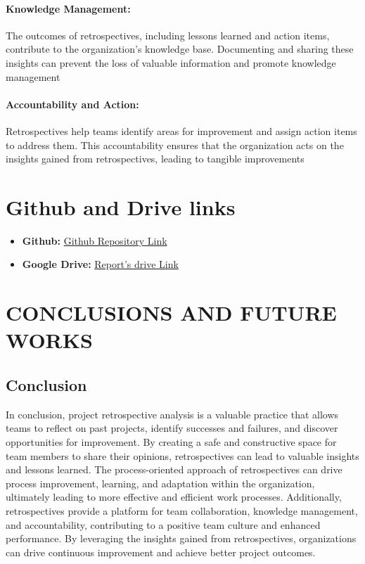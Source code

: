 \documentclass{article}
\begin{document}
\paragraph*{Knowledge Management:}The outcomes of retrospectives, including lessons learned and action items, contribute to the organization's knowledge base. Documenting and sharing these insights can prevent the loss of valuable information and promote knowledge management
\paragraph*{Accountability and Action:}Retrospectives help teams identify areas for improvement and assign action items to address them. This accountability ensures that the organization acts on the insights gained from retrospectives, leading to tangible improvements

\section{Github and Drive links}
\begin{itemize}
    \item \textbf{Github: }\href{https://github.com/saurabhs679/SOEN6841_TOPIC_ANALYSIS_AND_SYNTHESIS}{Github Repository Link}
    \item \textbf{Google Drive: }\href{https://drive.google.com/drive/folders/1ep7LRbaq3LcP8R7s5j6O8cZ1Xn__iD4b?usp=sharing}{Report's drive Link}
\end{itemize}


\newpage
\section{CONCLUSIONS AND FUTURE WORKS}
\subsection{Conclusion}
In conclusion, project retrospective analysis is a valuable practice that allows teams to reflect on past projects, identify successes and failures, and discover opportunities for improvement. By creating a safe and constructive space for team members to share their opinions, retrospectives can lead to valuable insights and lessons learned. The process-oriented approach of retrospectives can drive process improvement, learning, and adaptation within the organization, ultimately leading to more effective and efficient work processes. Additionally, retrospectives provide a platform for team collaboration, knowledge management, and accountability, contributing to a positive team culture and enhanced performance. By leveraging the insights gained from retrospectives, organizations can drive continuous improvement and achieve better project outcomes.
\end{document}
